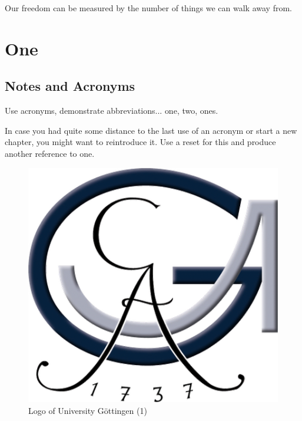 \begin{savequote}[75mm]
Our freedom can be measured by the number of things we can walk away from.
\end{savequote}

\chapter{One}
\label{cha:one}

\section{Notes and Acronyms}
\label{sec:notes-acronyms}


Use acronyms, demonstrate abbreviations... \Gls{one}, \gls{two}, \glspl{one}.

In case you had quite some distance to the last use of an acronym or start a new chapter, you might want to reintroduce it. Use a reset for this and produce another reference to \gls{one}.

\begin{figure}[!ht]
  \centering
  \includegraphics{figures/UniLogo1.png}
  \caption{Logo of University Göttingen (1)}
  \label{fig:logo-1}
\end{figure}


